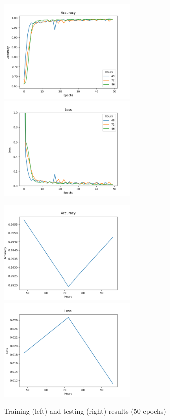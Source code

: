 \begin{figure}
      \begin{multicols}{2}
            \includegraphics[height=5cm]{img/control_condition/plot_acc_train_50e.png}
            \includegraphics[height=5cm]{img/control_condition/plot_loss_train_50e.png}

            \includegraphics[height=5cm]{img/control_condition/plot_acc_eval_50e.png}
            \includegraphics[height=5cm]{img/control_condition/plot_loss_eval_50e.png}
      \end{multicols}
      \caption{Training (left) and testing (right) results (50 epochs)}
      \label{figure:control_condition_50e}
\end{figure}

